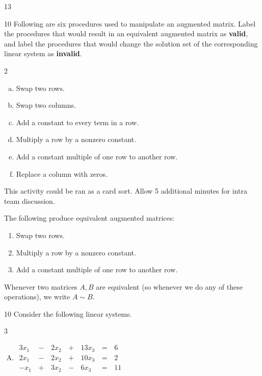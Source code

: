 \begin{applicationActivities}{1}{3}
\begin{activity}{10}
  Following are six procedures used to manipulate an augmented matrix.
  Label the procedures that would result in an equivalent augmented
  matrix as \textbf{valid}, and label the procedures that would
  change the solution set of the corresponding linear system as
  \textbf{invalid}.
  \begin{multicols}{2}
    \begin{enumerate}[a)]
      \item Swap two rows.
      \item Swap two columns.
      \item Add a constant to every term in a row.
      \item Multiply a row by a nonzero constant.
      \item Add a constant multiple of one row to another row.
      \item Replace a column with zeros.
    \end{enumerate}
  \end{multicols}
  \begin{TBLnote}
    This activity could be ran as a card sort.  Allow 5 additional minutes for intra team discussion.
  \end{TBLnote}
\end{activity}


\begin{definition}
  The following  produce equivalent
  augmented matrices:
  \begin{enumerate}
    \item Swap two rows.
    \item Multiply a row by a nonzero constant.
    \item Add a constant multiple of one row to another row.
  \end{enumerate}
  Whenever two matrices \(A,B\) are equivalent (so whenever we do any of
  these operations), we write \(A\sim B\).
\end{definition}

\begin{activity}{10}
  Consider the following  linear systems.
  \begin{multicols}{3}\noindent
  \begin{enumerate}[(A)]
    \item \(
		\begin{alignedat}{4}
   		  3x_1 &\,-\,& 2x_2 &\,+\,& 13x_3 &\,=\,& 6 \\
   		  2x_1 &\,-\,& 2x_2 &\,+\,& 10x_3 &\,=\,& 2 \\
   		  -x_1 &\,+\,& 3x_2 &\,-\,&  6x_3 &\,=\,& 11
   		\end{alignedat} 
	\)


\end{enumerate}
\end{multicols}
\end{activity}
\end{applicationActivities}
